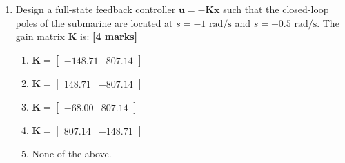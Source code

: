 \documentclass{article}
\begin{document}
\begin{enumerate}[resume]
    \begin{enumerate}[label=\alph*.]
        \item $s^2 + 0.14s + 0.002 = 0$; \quad $s \approx -0.0162, -0.1238$; \quad Stable
        \vspace{2mm}

        \item $s^2 + 0.14s + 0.006 = 0$; \quad $s \approx -0.07 \pm 0.0332j$; \quad Marginally stable
        \vspace{2mm}

        \item $s^2 - 0.14s + 0.002 = 0$; \quad $s \approx 0.0162, 0.1238$; \quad Unstable
        \vspace{2mm}

        \item $s^2 + 0.14s + 0.004 = 0$; \quad $s \approx -0.04, -0.10$; \quad Stable
        \vspace{2mm}

        \item None of the above.
    \end{enumerate}

    \item Design a full-state feedback controller $\mathbf{u} = -\mathbf{K}\mathbf{x}$ such that the closed-loop poles of the submarine are located at $s = -1\text{ rad/s}$ and $s = -0.5\text{ rad/s}$. The gain matrix $\mathbf{K}$ is: \hfill \textbf{[4 marks]}
    
    \begin{enumerate}[label=\alph*.]
        \item $\mathbf{K} = \begin{bmatrix} -148.71 & 807.14 \end{bmatrix}$
        \vspace{2mm}

        \item $\mathbf{K} = \begin{bmatrix} 148.71 & -807.14 \end{bmatrix}$
        \vspace{2mm}

        \item $\mathbf{K} = \begin{bmatrix} -68.00 & 807.14 \end{bmatrix}$
        \vspace{2mm}

        \item $\mathbf{K} = \begin{bmatrix} 807.14 & -148.71 \end{bmatrix}$
        \vspace{2mm}

        \item None of the above.
    \end{enumerate}
\end{enumerate}
    
\end{document}
